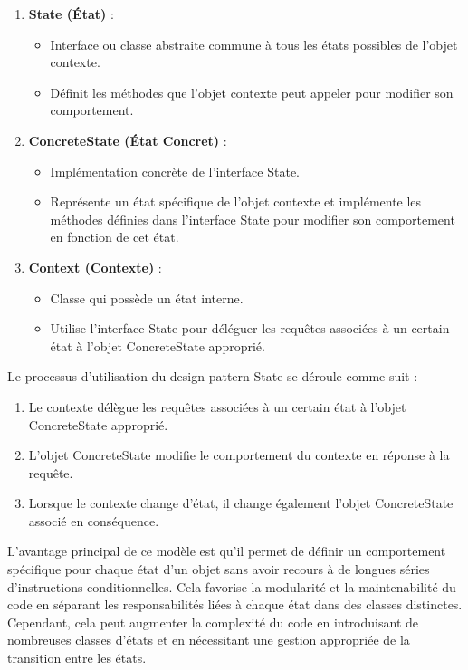 \begin{enumerate}[leftmargin=*,labelsep=3mm]
    \item \textbf{State (État)} :
    \begin{itemize}
        \item Interface ou classe abstraite commune à tous les états possibles de l'objet contexte.
        \item Définit les méthodes que l'objet contexte peut appeler pour modifier son comportement.
    \end{itemize}
    
    \item \textbf{ConcreteState (État Concret)} :
    \begin{itemize}
        \item Implémentation concrète de l'interface State.
        \item Représente un état spécifique de l'objet contexte et implémente les méthodes définies dans l'interface State pour modifier son comportement en fonction de cet état.
    \end{itemize}
    
    \item \textbf{Context (Contexte)} :
    \begin{itemize}
        \item Classe qui possède un état interne.
        \item Utilise l'interface State pour déléguer les requêtes associées à un certain état à l'objet ConcreteState approprié.
    \end{itemize}
\end{enumerate}

Le processus d'utilisation du design pattern State se déroule comme suit :

\begin{enumerate}[leftmargin=*,labelsep=3mm]
    \item Le contexte délègue les requêtes associées à un certain état à l'objet ConcreteState approprié.
    \item L'objet ConcreteState modifie le comportement du contexte en réponse à la requête.
    \item Lorsque le contexte change d'état, il change également l'objet ConcreteState associé en conséquence.
\end{enumerate}

L'avantage principal de ce modèle est qu'il permet de définir un comportement spécifique pour chaque état d'un objet sans avoir recours à de longues séries d'instructions conditionnelles. Cela favorise la modularité et la maintenabilité du code en séparant les responsabilités liées à chaque état dans des classes distinctes. Cependant, cela peut augmenter la complexité du code en introduisant de nombreuses classes d'états et en nécessitant une gestion appropriée de la transition entre les états.


